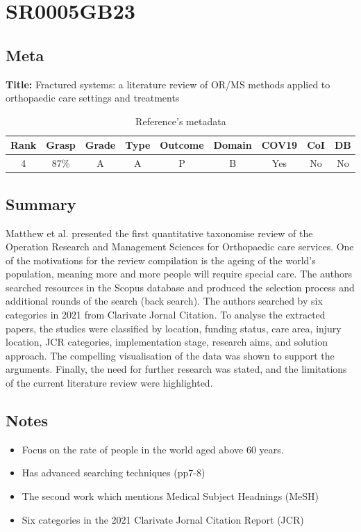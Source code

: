 \section{ SR0005GB23 }


\subsection{Meta}

    \textbf{Title:}
    Fractured systems: a literature review of OR/MS methods applied to orthopaedic care settings and treatments

    \begin{table}[H]
        \centering
        \begin{tabular}{|c|c|c|c|c|c|c|c|c|}
            \hline
                \textbf{Rank} & \textbf{Grasp} & \textbf{Grade} & \textbf{Type} & \textbf{Outcome} & \textbf{Domain} & \textbf{COV19} & \textbf{CoI} & \textbf{DB} \\
            \hline
                4 & 87\% & A & A & P & B & Yes & No & No \\
            \hline
        \end{tabular}
        \caption{Reference's metadata}
        \label{tab:SR0005GB23}
    \end{table}

\subsection{Summary}
    Matthew et al. presented the first quantitative taxonomise review of the Operation Research and Management Sciences for Orthopaedic care services. One of the motivations for the review compilation is the ageing of the world's population, meaning more and more people will require special care. The authors searched resources in the Scopus database and produced the selection process and additional rounds of the search (back search). The authors searched by six categories in 2021 from Clarivate Jornal Citation. To analyse the extracted papers, the studies were classified by location, funding status, care area, injury location, JCR categories, implementation stage, research aims, and solution approach. The compelling visualisation of the data was shown to support the arguments. Finally, the need for further research was stated, and the limitations of the current literature review were highlighted.
    

\subsection{Notes}
    \begin{itemize}
        \item Focus on the rate of people in the world aged above 60 years.
        \item Has advanced searching techniques (pp7-8)
        \item The second work which mentions Medical Subject Headnings (MeSH)
        \item Six categories in the 2021 Clarivate Jornal Citation Report (JCR)
    \end{itemize}


